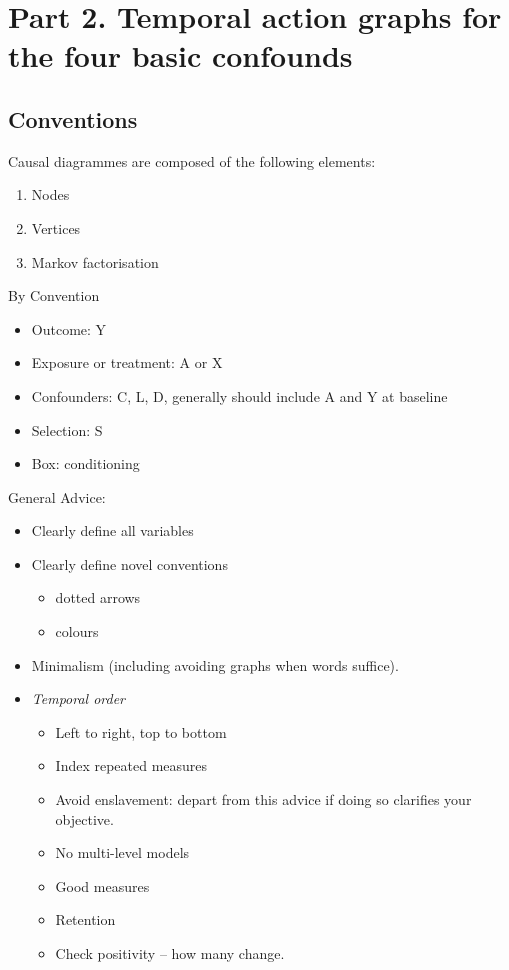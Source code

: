 \documentclass[
  singlecolumn]{report}
\providecommand{\tightlist}{%
  \setlength{\itemsep}{0pt}\setlength{\parskip}{0pt}}\usepackage{longtable,booktabs,array}
\begin{document}
\hypertarget{part-2.-temporal-action-graphs-for-the-four-basic-confounds}{%
\section{Part 2. Temporal action graphs for the four basic
confounds}\label{part-2.-temporal-action-graphs-for-the-four-basic-confounds}}

\hypertarget{conventions}{%
\subsection{Conventions}\label{conventions}}

Causal diagrammes are composed of the following elements:

\begin{enumerate}
\def\labelenumi{\arabic{enumi}.}
\tightlist
\item
  Nodes
\item
  Vertices
\item
  Markov factorisation
\end{enumerate}

By Convention

\begin{itemize}
\tightlist
\item
  Outcome: Y
\item
  Exposure or treatment: A or X
\item
  Confounders: C, L, D, generally should include A and Y at baseline
\item
  Selection: S
\item
  Box: conditioning
\end{itemize}

General Advice:

\begin{itemize}
\tightlist
\item
  Clearly define all variables
\item
  Clearly define novel conventions

  \begin{itemize}
  \tightlist
  \item
    dotted arrows
  \item
    colours
  \end{itemize}
\item
  Minimalism (including avoiding graphs when words suffice).
\item
  \emph{Temporal order}

  \begin{itemize}
  \tightlist
  \item
    Left to right, top to bottom
  \item
    Index repeated measures
  \item
    Avoid enslavement: depart from this advice if doing so clarifies
    your objective.
  \item
    No multi-level models
  \item
    Good measures
  \item
    Retention
  \item
    Check positivity -- how many change.
  \end{itemize}
\end{itemize}
\end{document}
